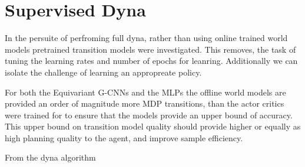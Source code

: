 \section{Supervised Dyna}
In the persuite of perfroming full dyna, rather than using online trained world models pretrained transition models were investigated. This removes, the task of tuning the learning rates and number of epochs for leanring. Additionally we can isolate the challenge of learning an appropreate policy.

For both the Equivariant G-CNNs and the MLPs the offline world models are provided an order of magnitude more MDP transitions, than the actor critics were trained for to ensure that the models provide an upper bound of accuracy. This upper bound on transition model quality should provide higher or equally as high planning quality to the agent, and improve sample efficiency.

From the dyna algorithm 

